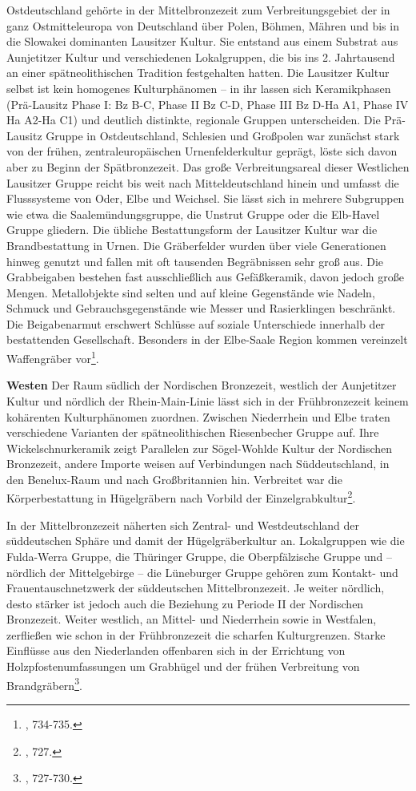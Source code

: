 \documentclass[openany,twoside,twocolumn]{book}
\let\rmarkdownfootnote\footnote%
\def\footnote{\protect\rmarkdownfootnote}
\begin{document}
Ostdeutschland gehörte in der Mittelbronzezeit zum Verbreitungsgebiet
der in ganz Ostmitteleuropa von Deutschland über Polen, Böhmen, Mähren
und bis in die Slowakei dominanten Lausitzer Kultur. Sie entstand aus
einem Substrat aus Aunjetitzer Kultur und verschiedenen Lokalgruppen,
die bis ins 2. Jahrtausend an einer spätneolithischen Tradition
festgehalten hatten. Die Lausitzer Kultur selbst ist kein homogenes
Kulturphänomen -- in ihr lassen sich Keramikphasen (Prä-Lausitz Phase I:
Bz B-C, Phase II Bz C-D, Phase III Bz D-Ha A1, Phase IV Ha A2-Ha C1) und
deutlich distinkte, regionale Gruppen unterscheiden. Die Prä-Lausitz
Gruppe in Ostdeutschland, Schlesien und Großpolen war zunächst stark von
der frühen, zentraleuropäischen Urnenfelderkultur geprägt, löste sich
davon aber zu Beginn der Spätbronzezeit. Das große Verbreitungsareal
dieser Westlichen Lausitzer Gruppe reicht bis weit nach
Mitteldeutschland hinein und umfasst die Flusssysteme von Oder, Elbe und
Weichsel. Sie lässt sich in mehrere Subgruppen wie etwa die
Saalemündungsgruppe, die Unstrut Gruppe oder die Elb-Havel Gruppe
gliedern. Die übliche Bestattungsform der Lausitzer Kultur war die
Brandbestattung in Urnen. Die Gräberfelder wurden über viele
Generationen hinweg genutzt und fallen mit oft tausenden Begräbnissen
sehr groß aus. Die Grabbeigaben bestehen fast ausschließlich aus
Gefäßkeramik, davon jedoch große Mengen. Metallobjekte sind selten und
auf kleine Gegenstände wie Nadeln, Schmuck und Gebrauchsgegenstände wie
Messer und Rasierklingen beschränkt. Die Beigabenarmut erschwert
Schlüsse auf soziale Unterschiede innerhalb der bestattenden
Gesellschaft. Besonders in der Elbe-Saale Region kommen vereinzelt
Waffengräber vor\footnote{\textcite{jockenhovel_germany_2013}, 734-735.}.

\textbf{Westen} \newline  Der Raum südlich der Nordischen Bronzezeit,
westlich der Aunjetitzer Kultur und nördlich der Rhein-Main-Linie lässt
sich in der Frühbronzezeit keinem kohärenten Kulturphänomen zuordnen.
Zwischen Niederrhein und Elbe traten verschiedene Varianten der
spätneolithischen Riesenbecher Gruppe auf. Ihre Wickelschnurkeramik
zeigt Parallelen zur Sögel-Wohlde Kultur der Nordischen Bronzezeit,
andere Importe weisen auf Verbindungen nach Süddeutschland, in den
Benelux-Raum und nach Großbritannien hin. Verbreitet war die
Körperbestattung in Hügelgräbern nach Vorbild der
Einzelgrabkultur\footnote{\textcite{jockenhovel_germany_2013}, 727.}.

In der Mittelbronzezeit näherten sich Zentral- und Westdeutschland der
süddeutschen Sphäre und damit der Hügelgräberkultur an. Lokalgruppen wie
die Fulda-Werra Gruppe, die Thüringer Gruppe, die Oberpfälzische Gruppe
und -- nördlich der Mittelgebirge -- die Lüneburger Gruppe gehören zum
Kontakt- und Frauentauschnetzwerk der süddeutschen Mittelbronzezeit. Je
weiter nördlich, desto stärker ist jedoch auch die Beziehung zu Periode
II der Nordischen Bronzezeit. Weiter westlich, an Mittel- und
Niederrhein sowie in Westfalen, zerfließen wie schon in der
Frühbronzezeit die scharfen Kulturgrenzen. Starke Einflüsse aus den
Niederlanden offenbaren sich in der Errichtung von
Holzpfostenumfassungen um Grabhügel und der frühen Verbreitung von
Brandgräbern\footnote{\textcite{jockenhovel_germany_2013}, 727-730.}.
\end{document}
